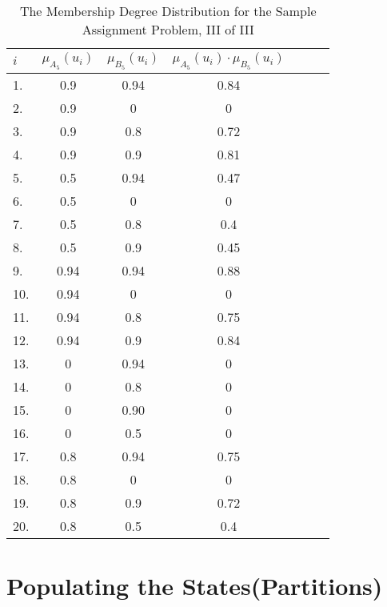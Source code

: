 \documentclass[a4paper,openany]{book}
\begin{document}
				\begin{table}[!th]
					\begin{center}
						\begin{tabular}{|l|c|c|c|c|c|c|}
							\hline
							\textbf{$i$} & \textbf{$\mu_{A_5}(u_i)$} & \textbf{$\mu_{B_5}(u_i)$} & \textbf{$\mu_{A_5}(u_i)\cdot\mu_{B_5}(u_i)$}\\
							\hline
							1. & 0.9 & 0.94 & 0.84 \\
							\hline
							2. & 0.9 & 0 & 0 \\
							\hline
							3. & 0.9 & 0.8 & 0.72 \\
							\hline
							4. & 0.9 & 0.9 & 0.81 \\
							\hline
							5. & 0.5 & 0.94 & 0.47 \\
							\hline
							6. & 0.5 & 0 & 0 \\
							\hline
							7. & 0.5 & 0.8 & 0.4 \\
							\hline
							8. & 0.5 & 0.9 & 0.45 \\
							\hline
							9. & 0.94 & 0.94 & 0.88 \\
							\hline
							10. & 0.94 & 0 & 0 \\
							\hline
							11. & 0.94 & 0.8 & 0.75 \\
							\hline
							12. & 0.94 & 0.9 & 0.84 \\
							\hline
							13. & 0 & 0.94 & 0 \\
							\hline
							14. & 0 & 0.8 & 0 \\
							\hline
							15. & 0 & 0.90 & 0 \\
							\hline
							16. & 0 & 0.5 & 0 \\
							\hline
							17. & 0.8 & 0.94 & 0.75 \\
							\hline
							18. & 0.8 & 0 & 0 \\
							\hline
							19. & 0.8 & 0.9 & 0.72 \\
							\hline
							20. & 0.8 & 0.5 & 0.4 \\
							\hline
						\end{tabular}
						\caption{The Membership Degree Distribution for the Sample Assignment Problem, III of III}
						\label{ex:table4}
					\end{center}					
				\end{table}
		\section{Populating the States(Partitions)}
\end{document}
